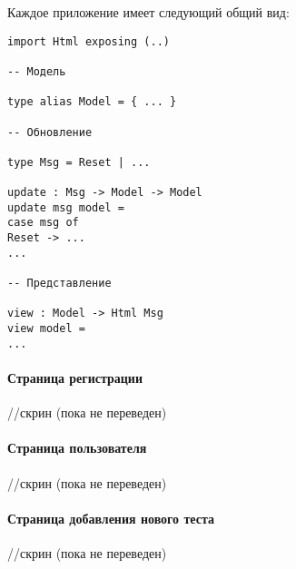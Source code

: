 Каждое приложение имеет следующий общий вид:
\begin{lstlisting}
import Html exposing (..)

-- Модель

type alias Model = { ... }

-- Обновление

type Msg = Reset | ...

update : Msg -> Model -> Model
update msg model =
case msg of
Reset -> ...
...

-- Представление

view : Model -> Html Msg
view model =
...
\end{lstlisting}

\paragraph{Страница регистрации}
//скрин (пока не переведен)
\paragraph{Страница пользователя}
//скрин (пока не переведен)
\paragraph{Страница добавления нового теста}
//скрин (пока не переведен)
